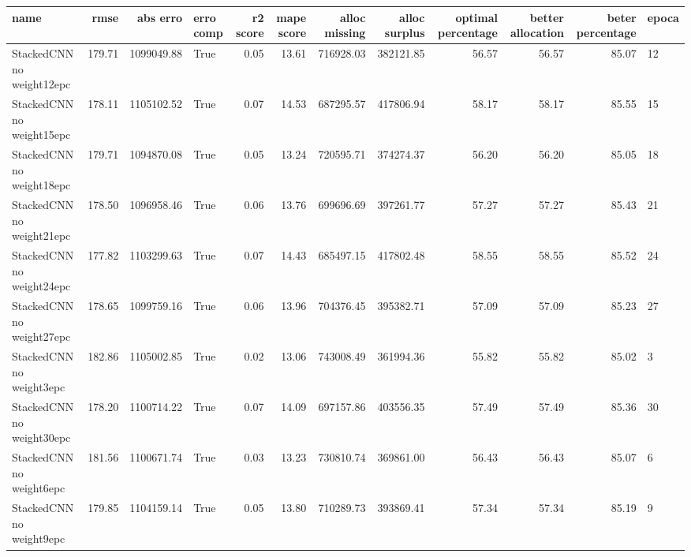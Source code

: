 \begin{tabular}{lrrlrrrrrrrl}
\toprule
name & rmse & abs erro & erro comp & r2 score & mape score & alloc missing & alloc surplus & optimal percentage & better allocation & beter percentage & epoca \\
\midrule
StackedCNN no weight12epc & 179.71 & 1099049.88 & True & 0.05 & 13.61 & 716928.03 & 382121.85 & 56.57 & 56.57 & 85.07 & 12 \\
StackedCNN no weight15epc & 178.11 & 1105102.52 & True & 0.07 & 14.53 & 687295.57 & 417806.94 & 58.17 & 58.17 & 85.55 & 15 \\
StackedCNN no weight18epc & 179.71 & 1094870.08 & True & 0.05 & 13.24 & 720595.71 & 374274.37 & 56.20 & 56.20 & 85.05 & 18 \\
StackedCNN no weight21epc & 178.50 & 1096958.46 & True & 0.06 & 13.76 & 699696.69 & 397261.77 & 57.27 & 57.27 & 85.43 & 21 \\
StackedCNN no weight24epc & 177.82 & 1103299.63 & True & 0.07 & 14.43 & 685497.15 & 417802.48 & 58.55 & 58.55 & 85.52 & 24 \\
StackedCNN no weight27epc & 178.65 & 1099759.16 & True & 0.06 & 13.96 & 704376.45 & 395382.71 & 57.09 & 57.09 & 85.23 & 27 \\
StackedCNN no weight3epc & 182.86 & 1105002.85 & True & 0.02 & 13.06 & 743008.49 & 361994.36 & 55.82 & 55.82 & 85.02 & 3 \\
StackedCNN no weight30epc & 178.20 & 1100714.22 & True & 0.07 & 14.09 & 697157.86 & 403556.35 & 57.49 & 57.49 & 85.36 & 30 \\
StackedCNN no weight6epc & 181.56 & 1100671.74 & True & 0.03 & 13.23 & 730810.74 & 369861.00 & 56.43 & 56.43 & 85.07 & 6 \\
StackedCNN no weight9epc & 179.85 & 1104159.14 & True & 0.05 & 13.80 & 710289.73 & 393869.41 & 57.34 & 57.34 & 85.19 & 9 \\
\bottomrule
\end{tabular}
